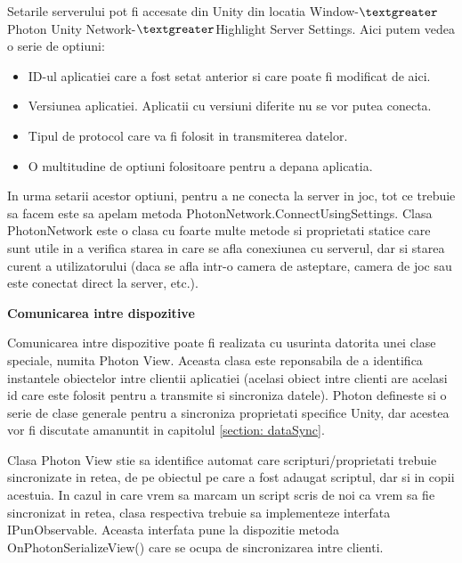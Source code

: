 \documentclass[12pt, a4paper]{article}
\begin{document}
	Setarile serverului pot fi accesate din Unity din locatia Window-$\textgreater$Photon Unity Network-$\textgreater$Highlight Server Settings. Aici putem vedea o serie de optiuni:
	
	\begin{itemize}
		\item ID-ul aplicatiei care a fost setat anterior si care poate fi modificat de aici.
		\item Versiunea aplicatiei. Aplicatii cu versiuni diferite nu se vor putea conecta.
		\item Tipul de protocol care va fi folosit in transmiterea datelor.
		\item O multitudine de optiuni folositoare pentru a depana aplicatia.
	\end{itemize}

	In urma setarii acestor optiuni, pentru a ne conecta la server in joc, tot ce trebuie sa facem este sa apelam metoda PhotonNetwork.ConnectUsingSettings. Clasa PhotonNetwork este o clasa cu foarte multe metode si proprietati statice care sunt utile in a verifica starea in care se afla conexiunea cu serverul, dar si starea curent a utilizatorului (daca se afla intr-o camera de asteptare, camera de joc sau este conectat direct la server, etc.).
	\newline
	

	
	
	\textbf{Comunicarea intre dispozitive}
	\newline
	
	Comunicarea intre dispozitive poate fi realizata cu usurinta datorita unei clase speciale, numita Photon View. Aceasta clasa este reponsabila de a identifica instantele obiectelor intre clientii aplicatiei (acelasi obiect intre clienti are acelasi id care este folosit pentru a transmite si sincroniza datele). Photon defineste si o serie de clase generale pentru a sincroniza proprietati specifice Unity, dar acestea vor fi discutate amanuntit in capitolul \ref{section: dataSync}.
	\newline
	
	Clasa Photon View stie sa identifice automat care scripturi/proprietati trebuie sincronizate in retea, de pe obiectul pe care a fost adaugat scriptul, dar si in copii acestuia. In cazul in care vrem sa marcam un script scris de noi ca vrem sa fie sincronizat in retea, clasa respectiva trebuie sa implementeze interfata IPunObservable. Aceasta interfata pune la dispozitie metoda OnPhotonSerializeView() care se ocupa de sincronizarea intre clienti.
	\newline
	
\end{document}
